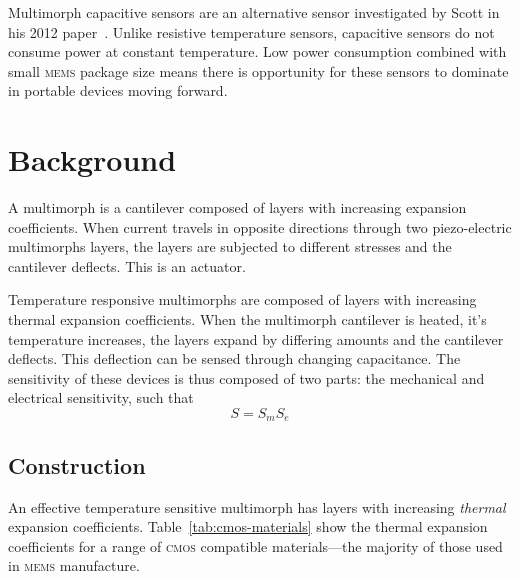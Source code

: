 \documentclass[a4paper,10pt,twocolumn]{article}
\newcommand{\cmos}{\textsc{cmos}\xspace}
\newcommand{\mems}{\textsc{mems}\xspace}
\begin{document}
Multimorph capacitive sensors are an alternative sensor investigated by Scott in
his 2012 paper~\cite{scott2012600}. Unlike resistive temperature sensors,
capacitive sensors do not consume power at constant temperature. Low power
consumption combined with small \mems package size means there is opportunity
for these sensors to dominate in portable devices moving forward.

\section{Background}

A multimorph is a cantilever composed of layers with increasing expansion
coefficients. When current travels in opposite directions through
two piezo-electric multimorphs layers, the layers are subjected to different
stresses and the cantilever deflects. This is an actuator.

Temperature responsive multimorphs are composed of layers with increasing
thermal expansion coefficients. When the multimorph cantilever is heated, it's
temperature increases, the layers expand by differing amounts and the cantilever
deflects. This deflection can be sensed through changing capacitance. The 
sensitivity of these devices is thus composed of two parts: the mechanical and 
electrical sensitivity, such that
\begin{equation} \label{eq:S}
    S=S_m S_e
\end{equation}


\subsection{Construction}

An effective temperature sensitive multimorph has layers with increasing
\emph{thermal} expansion coefficients. Table~\ref{tab:cmos-materials} show the 
thermal expansion coefficients for a range of \cmos compatible materials---the 
majority of those used in \mems manufacture.
\end{document}
